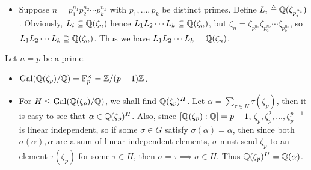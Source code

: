 \begin{prop}
\begin{itemize}
      \begin{proof}
        Let $\sigma_k = (\zeta_n \mapsto \zeta_n^k) \in \Gal(\Qb(\zeta_n) / \Qb)$.
        The isomorphism is given by $\sigma_k \mapsto \bar{k}$.
        Clearly, it is a homomorphism since $\sigma_k \sigma_h = (\zeta_n \mapsto \zeta_n^{kh}) = \sigma_{kh}$.
        Also $\sigma_k = 1 \iff \bar{k} = 1$. Finally, $\abs{\Gal(\Qb(\zeta_n) / \Qb)} = \abs{\Fb_n^\times} = \varphi(n)$,
        so the map is onto.
      \end{proof}
    \item Suppose $n = p_1^{n_1} p_2^{n_2} \cdots p_k^{n_k}$ with $p_1, \dots, p_k$ be distinct primes.
      Define $L_i \triangleq \mathbb{Q}(\zeta_{p_i^{n_i}})$. Obviously, $L_i \subseteq \mathbb{Q}(\zeta_n)$ hence
      $L_1 L_2 \dotsm L_k \subseteq \mathbb{Q}(\zeta_n)$, but $\zeta_n = \zeta_{p_1^{n_1}} \zeta_{p_2^{n_2}}
      \dotsm \zeta_{p_k^{n_k}}$, so $L_1 L_2 \dotsm L_k \supseteq \mathbb{Q}(\zeta_n)$. Thus we have
      $L_1 L_2 \dotsm L_k = \mathbb{Q}(\zeta_n)$.
  \end{itemize}
\end{prop}

\begin{example}
  Let $n = p$ be a prime.
  \begin{itemize}
    \item $\operatorname{Gal}(\mathbb{Q}(\zeta_p) / \mathbb{Q}) = \mathbb{F}_p^\times = \mathbb{Z} / (p-1)\mathbb{Z}$.
    \item For $H \leq \operatorname{Gal}(\mathbb{Q}(\zeta_p) / \mathbb{Q})$, we shall find $\mathbb{Q}(\zeta_p)^H$.
      Let $\alpha = \sum_{\tau \in H} \tau(\zeta_p)$, then it is easy to
      see that $\alpha \in \mathbb{Q}(\zeta_p)^H$. Also, since $[\mathbb{Q}(\zeta_p): \mathbb{Q}] = p-1$,
      $\zeta_p, \zeta_p^2, \dots, \zeta_p^{p-1}$ is linear independent,
      so if some $\sigma \in G$ satisfy $\sigma(\alpha) = \alpha$, then since
      both $\sigma(\alpha), \alpha$ are a sum of linear independent elements,
      $\sigma$ must send $\zeta_p$ to an element $\tau(\zeta_p)$ for some $\tau \in H$,
      then $\sigma = \tau \implies \sigma \in H$. Thus $\mathbb{Q}(\zeta_p)^H = \mathbb{Q}(\alpha)$.
  \end{itemize}
\end{example}

